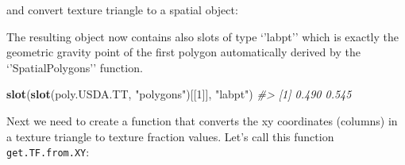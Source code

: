 \documentclass[11pt]{krantz}
\newenvironment{Shaded}{\begin{snugshade}}{\end{snugshade}}
\newcommand{\CommentTok}[1]{\textcolor[rgb]{0.37,0.37,0.37}{\textit{#1}}}
\newcommand{\ControlFlowTok}[1]{\textcolor[rgb]{0.27,0.27,0.27}{\textbf{#1}}}
\newcommand{\DataTypeTok}[1]{\textcolor[rgb]{0.27,0.27,0.27}{#1}}
\newcommand{\DecValTok}[1]{\textcolor[rgb]{0.06,0.06,0.06}{#1}}
\newcommand{\FloatTok}[1]{\textcolor[rgb]{0.06,0.06,0.06}{#1}}
\newcommand{\KeywordTok}[1]{\textcolor[rgb]{0.27,0.27,0.27}{\textbf{#1}}}
\newcommand{\NormalTok}[1]{#1}
\newcommand{\OperatorTok}[1]{\textcolor[rgb]{0.43,0.43,0.43}{\textbf{#1}}}
\newcommand{\OtherTok}[1]{\textcolor[rgb]{0.37,0.37,0.37}{#1}}
\newcommand{\StringTok}[1]{\textcolor[rgb]{0.5,0.5,0.5}{#1}}
\theoremstyle{definition}
\theoremstyle{definition}
\theoremstyle{definition}
\theoremstyle{remark}
\begin{document}
and convert texture triangle to a spatial object:

\begin{Shaded}
\end{Shaded}

The resulting object now contains also slots of type `'labpt'' which is
exactly the geometric gravity point of the first polygon automatically
derived by the `'SpatialPolygons'' function.

\begin{Shaded}
\begin{Highlighting}[]
\KeywordTok{slot}\NormalTok{(}\KeywordTok{slot}\NormalTok{(poly.USDA.TT, }\StringTok{"polygons"}\NormalTok{)[[}\DecValTok{1}\NormalTok{]], }\StringTok{"labpt"}\NormalTok{)}
\CommentTok{#> [1] 0.490 0.545}
\end{Highlighting}
\end{Shaded}

Next we need to create a function that converts the xy coordinates
(columns) in a texture triangle to texture fraction values. Let's call
this function \texttt{get.TF.from.XY}:

\begin{Shaded}
\end{Shaded}
\end{document}
